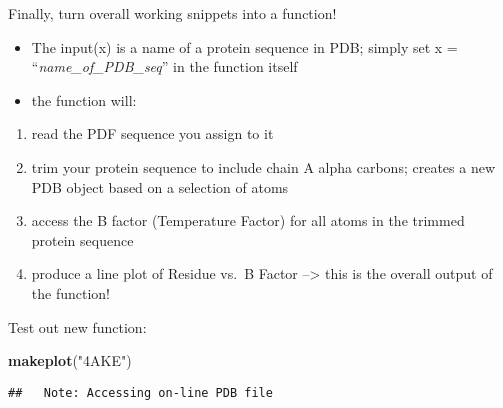 \documentclass[]{article}
\newenvironment{Shaded}{\begin{snugshade}}{\end{snugshade}}
\newcommand{\KeywordTok}[1]{\textcolor[rgb]{0.13,0.29,0.53}{\textbf{#1}}}
\newcommand{\DataTypeTok}[1]{\textcolor[rgb]{0.13,0.29,0.53}{#1}}
\newcommand{\StringTok}[1]{\textcolor[rgb]{0.31,0.60,0.02}{#1}}
\newcommand{\ControlFlowTok}[1]{\textcolor[rgb]{0.13,0.29,0.53}{\textbf{#1}}}
\newcommand{\OperatorTok}[1]{\textcolor[rgb]{0.81,0.36,0.00}{\textbf{#1}}}
\newcommand{\NormalTok}[1]{#1}
\providecommand{\tightlist}{%
  \setlength{\itemsep}{0pt}\setlength{\parskip}{0pt}}
\begin{document}
Finally, turn overall working snippets into a function!

\begin{itemize}
\item
  The input(x) is a name of a protein sequence in PDB; simply set x =
  ``\emph{name\_of\_PDB\_seq}'' in the function itself
\item
  the function will:
\end{itemize}

\begin{enumerate}
\def\labelenumi{\arabic{enumi}.}
\tightlist
\item
  read the PDF sequence you assign to it
\item
  trim your protein sequence to include chain A alpha carbons; creates a
  new PDB object based on a selection of atoms
\item
  access the B factor (Temperature Factor) for all atoms in the trimmed
  protein sequence
\item
  produce a line plot of Residue vs.~B Factor --\textgreater{} this is
  the overall output of the function!
\end{enumerate}

\begin{Shaded}
\end{Shaded}

Test out new function:

\begin{Shaded}
\begin{Highlighting}[]
\KeywordTok{makeplot}\NormalTok{(}\StringTok{"4AKE"}\NormalTok{)}
\end{Highlighting}
\end{Shaded}

\begin{verbatim}
##   Note: Accessing on-line PDB file
\end{verbatim}
\end{document}
